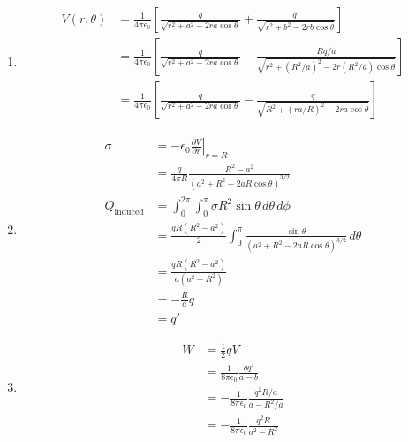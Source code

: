 \documentclass{article}
\newcommand{\ke}{\frac{1}{4 \pi \epsilon_0}}
\begin{document}
\begin{enumerate}
  \item

        \begin{align*}
          V(r, \theta) & = \ke \left[ \frac{q}{\sqrt{r^2 + a^2 - 2 r a \cos \theta}} + \frac{q'}{\sqrt{r^2 + b^2 - 2 r b \cos \theta}} \right]                      \\
                       & = \ke \left[ \frac{q}{\sqrt{r^2 + a^2 - 2 r a \cos \theta}} - \frac{R q / a}{\sqrt{r^2 + (R^2 / a)^2 - 2 r (R^2 / a) \cos \theta}} \right] \\
                       & = \ke \left[ \frac{q}{\sqrt{r^2 + a^2 - 2 r a \cos \theta}} - \frac{q}{\sqrt{R^2 + (r a / R)^2 - 2 r a \cos \theta}} \right]
        \end{align*}

  \item

        \begin{align*}
          \sigma           & = -\epsilon_0 \left. \frac{\partial V}{\partial r} \right|_{r = R}                                            \\
                           & = \frac{q}{4 \pi R} \frac{R^2 - a^2}{(a^2 + R^2 - 2 a R \cos \theta)^{3 / 2}}                                 \\
          Q_\text{induced} & = \int_0^{2 \pi} \int_0^\pi \sigma R^2 \sin \theta \,d \theta \,d \phi                                        \\
                           & = \frac{q R (R^2 - a^2)}{2} \int_0^\pi \frac{\sin \theta}{(a^2 + R^2 - 2 a R \cos \theta)^{3 / 2}} \,d \theta \\
                           & = \frac{q R (R^2 - a^2)}{a (a^2 - R^2)}                                                                       \\
                           & = -\frac{R}{a} q                                                                                              \\
                           & = q'
        \end{align*}

  \item

        \begin{align*}
          W & = \frac{1}{2} q V                                           \\
            & = \frac{1}{8 \pi \epsilon_0} \frac{q q'}{a - b}             \\
            & = -\frac{1}{8 \pi \epsilon_0} \frac{q^2 R / a}{a - R^2 / a} \\
            & = -\frac{1}{8 \pi \epsilon_0} \frac{q^2 R}{a^2 - R^2}
        \end{align*}
\end{enumerate}
\end{document}
